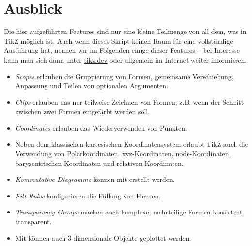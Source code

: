 \section{Ausblick}
Die hier aufgeführten Features sind nur eine kleine Teilmenge von all dem, was in TikZ möglich ist.
Auch wenn dieses Skript keinen Raum für eine vollständige Ausführung hat, nennen wir im Folgenden einige dieser Features -- bei Interesse kann man sich dann unter \url{tikz.dev} oder allgemein im Internet weiter informieren.
\begin{itemize}
	\item \emph{Scopes} erlauben die Gruppierung von Formen, gemeinsame Verschiebung, Anpassung und Teilen von optionalen Argumenten.
	\item \emph{Clips} erlauben das nur teilweise Zeichnen von Formen, z.B. wenn der Schnitt zwischen zwei Formen eingefärbt werden soll.
	\item \emph{Coordinates} erlauben das Wiederverwenden von Punkten.
	\item Neben dem klassischen kartesischen Koordinatensystem erlaubt TikZ auch die Verwendung von Polarkoordinaten, xyz-Koordinaten, node-Koordinaten, baryzentrischen Koordinaten und relativen Koordinaten.
	\item \emph{Kommutative Diagramme} können mit  erstellt werden.
	\item \emph{Fill Rules} konfigurieren die Füllung von Formen.
	\item \emph{Transparency Groups} machen auch komplexe, mehrteilige Formen konsistent transparent.
	\item Mit  können auch 3-dimensionale Objekte geplottet werden.
\end{itemize}
